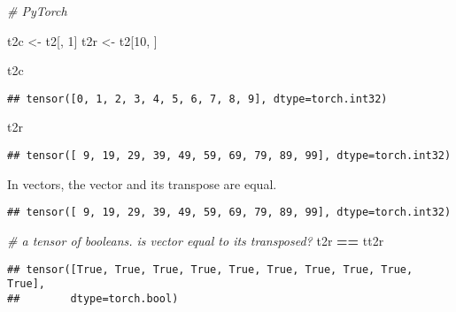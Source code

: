 \documentclass[]{book}
\newenvironment{Shaded}{\begin{snugshade}}{\end{snugshade}}
\newcommand{\CommentTok}[1]{\textcolor[rgb]{0.56,0.35,0.01}{\textit{#1}}}
\newcommand{\DataTypeTok}[1]{\textcolor[rgb]{0.13,0.29,0.53}{#1}}
\newcommand{\DecValTok}[1]{\textcolor[rgb]{0.00,0.00,0.81}{#1}}
\newcommand{\KeywordTok}[1]{\textcolor[rgb]{0.13,0.29,0.53}{\textbf{#1}}}
\newcommand{\NormalTok}[1]{#1}
\newcommand{\OperatorTok}[1]{\textcolor[rgb]{0.81,0.36,0.00}{\textbf{#1}}}
\newcommand{\StringTok}[1]{\textcolor[rgb]{0.31,0.60,0.02}{#1}}
\begin{document}
\begin{Shaded}
\begin{Highlighting}[]
\CommentTok{# PyTorch}

\NormalTok{t2c <-}\StringTok{ }\NormalTok{t2[, }\DecValTok{1}\NormalTok{]}
\NormalTok{t2r <-}\StringTok{ }\NormalTok{t2[}\DecValTok{10}\NormalTok{, ]}

\NormalTok{t2c}
\end{Highlighting}
\end{Shaded}

\begin{verbatim}
## tensor([0, 1, 2, 3, 4, 5, 6, 7, 8, 9], dtype=torch.int32)
\end{verbatim}

\begin{Shaded}
\begin{Highlighting}[]
\NormalTok{t2r}
\end{Highlighting}
\end{Shaded}

\begin{verbatim}
## tensor([ 9, 19, 29, 39, 49, 59, 69, 79, 89, 99], dtype=torch.int32)
\end{verbatim}

In vectors, the vector and its transpose are equal.

\begin{Shaded}
\end{Shaded}

\begin{verbatim}
## tensor([ 9, 19, 29, 39, 49, 59, 69, 79, 89, 99], dtype=torch.int32)
\end{verbatim}

\begin{Shaded}
\begin{Highlighting}[]
\CommentTok{# a tensor of booleans. is vector equal to its transposed?}
\NormalTok{t2r }\OperatorTok{==}\StringTok{ }\NormalTok{tt2r}
\end{Highlighting}
\end{Shaded}

\begin{verbatim}
## tensor([True, True, True, True, True, True, True, True, True, True],
##        dtype=torch.bool)
\end{verbatim}
\end{document}
